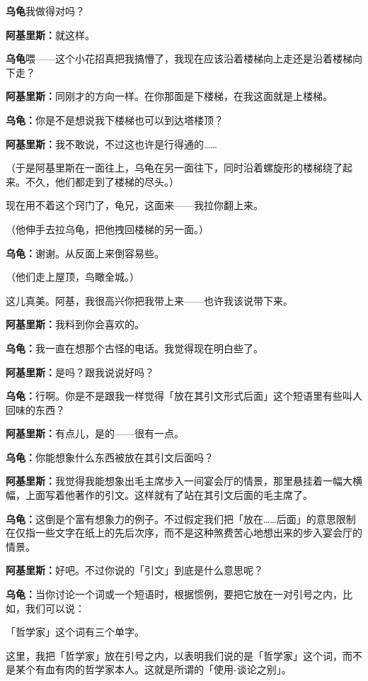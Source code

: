 \documentclass[
  12pt,
  twoside,
  openright,
  oldfontcommands,
]{memoir}
\newcommand{\dialogname}[1]{{\heifamily\bfseries #1}}
\begin{document}
\dialogname{乌龟}我做得对吗？

\dialogname{阿基里斯：}就这样。

\dialogname{乌龟}喂------这个小花招真把我搞懵了，我现在应该沿着楼梯向上走还是沿着楼梯向下走？

\dialogname{阿基里斯：}同刚才的方向一样。在你那面是下楼梯，在我这面就是上楼梯。

\dialogname{乌龟：}你是不是想说我下楼梯也可以到达塔楼顶？

\dialogname{阿基里斯：}我不敢说，不过这也许是行得通的\ldots\ldots{}

（于是阿基里斯在一面往上，乌龟在另一面往下，同时沿着螺旋形的楼梯绕了起来。不久，他们都走到了楼梯的尽头。）

现在用不着这个窍门了，龟兄，这面来------我拉你翻上来。

（他伸手去拉乌龟，把他拽回楼梯的另一面。）

\dialogname{乌龟：}谢谢。从反面上来倒容易些。

（他们走上屋顶，鸟瞰全城。）

这儿真美。阿基，我很高兴你把我带上来------也许我该说带下来。

\dialogname{阿基里斯：}我料到你会喜欢的。

\dialogname{乌龟：}我一直在想那个古怪的电话。我觉得现在明白些了。

\dialogname{阿基里斯：}是吗？跟我说说好吗？

\dialogname{乌龟：}行啊。你是不是跟我一样觉得「放在其引文形式后面」这个短语里有些叫人回味的东西？

\dialogname{阿基里斯：}有点儿，是的------很有一点。

\dialogname{乌龟：}你能想象什么东西被放在其引文后面吗？

\dialogname{阿基里斯：}我觉得我能想象出毛主席步入一间宴会厅的情景，那里悬挂着一幅大横幅，上面写着他著作的引文。这样就有了站在其引文后面的毛主席了。

\dialogname{乌龟：}这倒是个富有想象力的例子。不过假定我们把「放在\ldots\ldots 后面」的意思限制在仅指一些文字在纸上的先后次序，而不是这种煞费苦心地想出来的步入宴会厅的情景。

\dialogname{阿基里斯：}好吧。不过你说的「引文」到底是什么意思呢？

\dialogname{乌龟：}当你讨论一个词或一个短语时，根据惯例，要把它放在一对引号之内，比如，我们可以说：

「哲学家」这个词有三个单字。

这里，我把「哲学家」放在引号之内，以表明我们说的是「哲学家」这个词，而不是某个有血有肉的哲学家本人。这就是所谓的「使用-谈论之别」。
\end{document}
